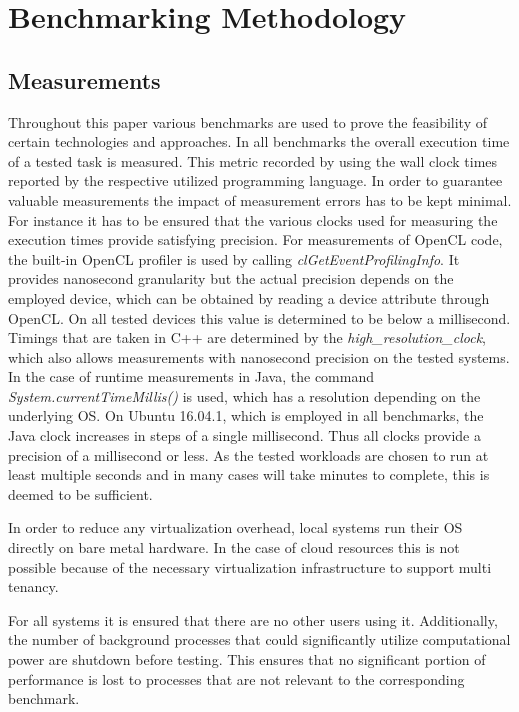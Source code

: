 \chapter{Benchmarking Methodology}
\label{benchmarking_methodology}
\section{Measurements}

Throughout this paper various benchmarks are used to prove the feasibility of certain technologies and approaches. In all benchmarks the overall execution time of a tested task is measured. This metric recorded by using the wall clock times reported by the respective utilized programming language. In order to guarantee valuable measurements the impact of measurement errors has to be kept minimal. For instance it has to be ensured that the various clocks used for measuring the execution times provide satisfying precision. For measurements of OpenCL code, the built-in OpenCL profiler is used by calling \textit{clGetEventProfilingInfo}. It provides nanosecond granularity but the actual precision depends on the employed device\cite{cl_profiling}, which can be obtained by reading a device attribute through OpenCL. On all tested devices this value is determined to be below a millisecond. Timings that are taken in C++ are determined by the \textit{high\_resolution\_clock}, which also allows measurements with nanosecond precision on the tested systems. In the case of runtime measurements in Java, the command \textit{System.currentTimeMillis()} is used, which has a resolution depending on the underlying OS\cite{oracle_system}. On Ubuntu 16.04.1, which is employed in all benchmarks, the Java clock increases in steps of a single millisecond. Thus all clocks provide a precision of a millisecond or less. As the tested workloads are chosen to run at least multiple seconds and in many cases will take minutes to complete, this is deemed to be sufficient.

In order to reduce any virtualization overhead, local systems run their OS directly on bare metal hardware. In the case of cloud resources this is not possible because of the necessary virtualization infrastructure to support multi tenancy.

For all systems it is ensured that there are no other users using it. Additionally, the number of background processes that could significantly utilize computational power are shutdown before testing. This ensures that no significant portion of performance is lost to processes that are not relevant to the corresponding benchmark.

